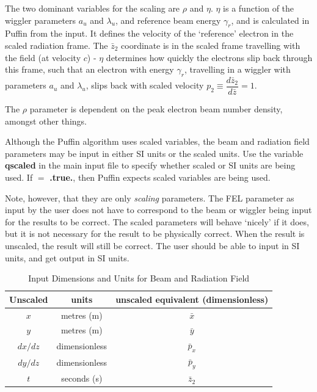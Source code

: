 \documentclass[12pt]{article}%
\begin{document}
The two dominant variables for the scaling are $\rho$ and $\eta$. $\eta$ is a function of the wiggler parameters $a_u$ and $\lambda_u$, and reference beam energy $\gamma_r$, and is calculated in Puffin from the input. It defines the velocity of the `reference' electron in the scaled radiation frame. The $\bar{z}_2$ coordinate is in the scaled frame travelling with the field (at velocity $c$) - $\eta$ determines how quickly the electrons slip back through this frame, such that an electron with energy $\gamma_r$, travelling in a wiggler with parameters $a_u$ and $\lambda_u$, slips back with scaled velocity $p_2 \equiv \dfrac{d \bar{z}_2}{d\bar{z}} = 1$.

The $\rho$ parameter is dependent on the peak electron beam number density, amongst other things.

Although the Puffin algorithm uses scaled variables, the beam and radiation field parameters may be input in either SI units or the scaled units. Use the variable {\bf qscaled} in the main input file to specify whether scaled or SI units are being used. If $=$ {\bf .true.}, then Puffin expects scaled variables are being used. %

Note, however, that they are only \textit{scaling} parameters. The FEL parameter as input by the user does not have to correspond to the beam or wiggler being input for the results to be correct. The scaled parameters will behave `nicely' if it does, but it is not necessary for the result to be physically correct. When the result is unscaled, the result will still be correct. The user should be able to input in SI units, and get output in SI units.



\begin{table}
\centering
\caption[Input Units]{Input Dimensions and Units for Beam and Radiation Field}
\begin{tabular}{|  c   | c  |   c   |}
\hline
Unscaled & units & unscaled equivalent (dimensionless) \\
\hline
$x$ & metres (m) & $\bar{x}$ \\
\hline
$y$ & metres (m) & $\bar{y}$ \\
\hline
$dx/dz$ & dimensionless & $\bar{p}_x$ \\
\hline
$dy/dz$ & dimensionless & $\bar{p}_y$ \\
\hline
$t$ & seconds (s) & $\bar{z}_2$ \\
\hline
\end{tabular}
\label{table}
\vspace*{-\baselineskip}
\end{table}
\end{document}
